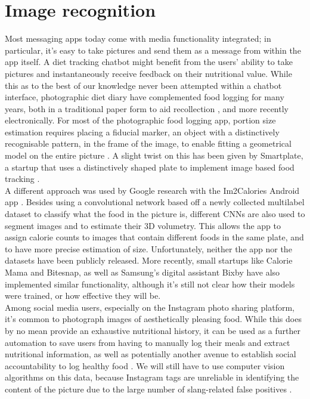 \section{Image recognition}
Most messaging apps today come with media functionality integrated; in particular, it's easy to take pictures and send them as a message from within the app itself. A diet tracking chatbot might benefit from the users' ability to take pictures and instantaneously receive feedback on their nutritional value. While this as to the best of our knowledge never been attempted within a chatbot interface, photographic diet diary have complemented food logging for many years, both in a traditional paper form to aid recollection \cite{Higgins2009}, and more recently electronically. For most of the photographic food logging app, portion size estimation requires placing a fiducial marker, an object with a distinctively recognisable pattern, in the frame of the image, to enable fitting a geometrical model on the entire picture \cite{Ahmad2016}. A slight twist on this has been given by Smartplate, a startup that uses a distinctively shaped plate to implement image based food tracking \cite{smartplate}.\\
A different approach was used by Google research with the Im2Calories Android app \cite{Myers2015}. Besides using a convolutional network based off a newly collected multilabel dataset to classify what the food in the picture is, different CNNs are also used to segment images and to estimate their 3D volumetry. This allows the app to assign calorie counts to images that contain different foods in the same plate, and to have more precise estimation of size. Unfortunately, neither the app nor the datasets have been publicly released. More recently, small startups like Calorie Mama\cite{caloriemamaai} and Bitesnap\cite{bitesnap}, as well as Samsung's digital assistant Bixby \cite{bixbyarticle} have also implemented similar functionality, although it's still not clear how their models were trained, or how effective they will be. \\
Among social media users, especially on the Instagram photo sharing platform, it's common to photograph images of aesthetically pleasing food. While this does by no mean provide an exhaustive nutritional history, it can be used as a further automation to save users from having to manually log their meals and extract nutritional information, as well as potentially another avenue to establish social accountability to log healthy food \cite{Sharma:2015:MCN:2740908.2742754}. We will still have to use computer vision algorithms on this data, because Instagram tags are unreliable in identifying the content of the picture due to the large number of slang-related false positives \cite{hospedales2016}.
